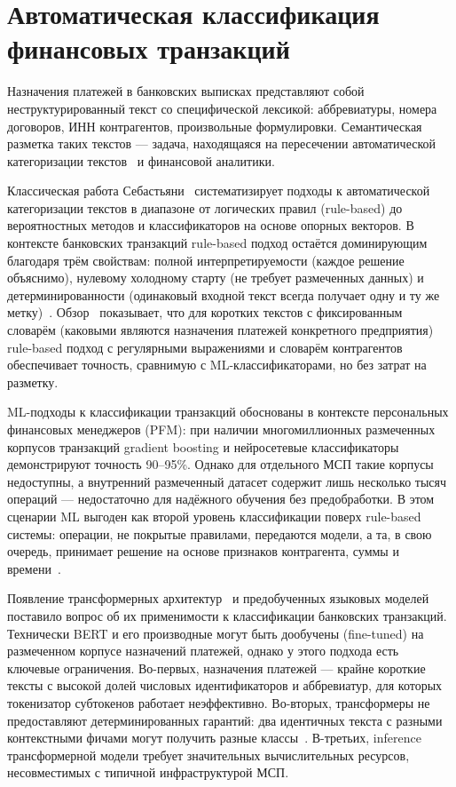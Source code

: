 \section{Автоматическая классификация финансовых транзакций}

Назначения платежей в банковских выписках представляют собой неструктурированный текст со специфической лексикой: аббревиатуры, номера договоров, ИНН контрагентов, произвольные формулировки. Семантическая разметка таких текстов --- задача, находящаяся на пересечении автоматической категоризации текстов~\cite{sebastiani2002machine} и финансовой аналитики.

Классическая работа Себастьяни~\cite{sebastiani2002machine} систематизирует подходы к автоматической категоризации текстов в диапазоне от логических правил (rule-based) до вероятностных методов и классификаторов на основе опорных векторов. В контексте банковских транзакций rule-based подход остаётся доминирующим благодаря трём свойствам: полной интерпретируемости (каждое решение объяснимо), нулевому холодному старту (не требует размеченных данных) и детерминированности (одинаковый входной текст всегда получает одну и ту же метку)~\cite{Cohen1995}. Обзор~\cite{aggarwal2012survey} показывает, что для коротких текстов с фиксированным словарём (каковыми являются назначения платежей конкретного предприятия) rule-based подход с регулярными выражениями и словарём контрагентов обеспечивает точность, сравнимую с ML-классификаторами, но без затрат на разметку.

ML-подходы к классификации транзакций обоснованы в контексте персональных финансовых менеджеров (PFM): при наличии многомиллионных размеченных корпусов транзакций gradient boosting и нейросетевые классификаторы демонстрируют точность 90--95\%. Однако для отдельного МСП такие корпусы недоступны, а внутренний размеченный датасет содержит лишь несколько тысяч операций --- недостаточно для надёжного обучения без предобработки. В этом сценарии ML выгоден как второй уровень классификации поверх rule-based системы: операции, не покрытые правилами, передаются модели, а та, в свою очередь, принимает решение на основе признаков контрагента, суммы и времени~\cite{pustejovsky2012natural}.

Появление трансформерных архитектур~\cite{vaswani2017attention} и предобученных языковых моделей~\cite{devlin2018bert} поставило вопрос об их применимости к классификации банковских транзакций. Технически BERT и его производные могут быть дообучены (fine-tuned) на размеченном корпусе назначений платежей, однако у этого подхода есть ключевые ограничения. Во-первых, назначения платежей --- крайне короткие тексты с высокой долей числовых идентификаторов и аббревиатур, для которых токенизатор субтокенов работает неэффективно. Во-вторых, трансформеры не предоставляют детерминированных гарантий: два идентичных текста с разными контекстными фичами могут получить разные классы~\cite{ji2023survey}. В-третьих, inference трансформерной модели требует значительных вычислительных ресурсов, несовместимых с типичной инфраструктурой МСП.

